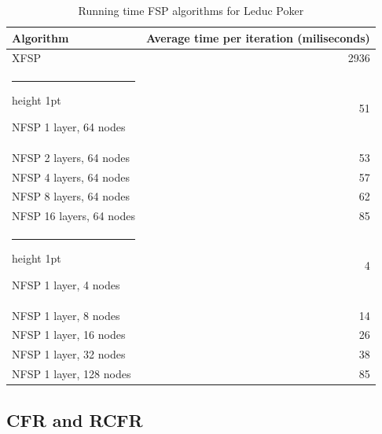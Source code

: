 \documentclass[10pt,a4paper]{article}
\makeatletter
\newcommand{\thickhline}{%
    \noalign {\ifnum 0=`}\fi \hrule height 1pt
    \futurelet \reserved@a \@xhline
}
\makeatother
\begin{document}
\begin{table}
\begin{center}
\begin{tabular}{|l|r|}
\hline 
Algorithm & Average time per iteration (miliseconds) \\\hline 
XFSP & 2936 \\ 
\thickhline 
NFSP 1 layer, 64 nodes & 51 \\ 
\hline 
NFSP 2 layers, 64 nodes  & 53 \\ 
\hline 
NFSP 4 layers, 64 nodes & 57 \\ 
\hline 
NFSP 8 layers, 64 nodes & 62 \\ 
\hline 
NFSP 16 layers, 64 nodes & 85 \\ 
\thickhline
NFSP 1 layer, 4 nodes & 4 \\ 
\hline 
NFSP 1 layer, 8 nodes & 14 \\ 
\hline 
NFSP 1 layer, 16 nodes & 26 \\ 
\hline 
NFSP 1 layer, 32 nodes & 38 \\ 
\hline 
NFSP 1 layer, 128 nodes & 85 \\ 
\hline 
\end{tabular}
\caption{Running time FSP algorithms for Leduc Poker}
\end{center}
\end{table} 

\subsection{CFR and RCFR}
\end{document}
